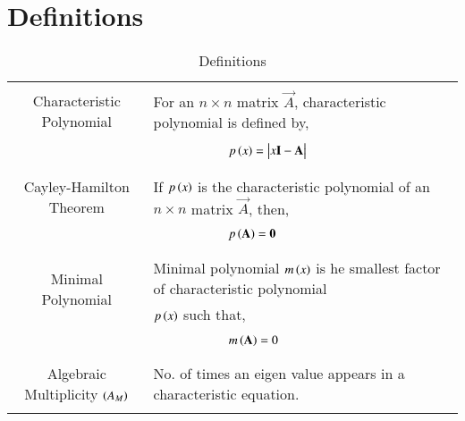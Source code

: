 \documentclass[journal,12pt]{IEEEtran}
\begin{document}
\section{\textbf{Definitions}}
\renewcommand{\thetable}{1}
\begin{table}[ht!]
\centering
\begin{tabular}{|c|l|}
    \hline
	\multirow{3}{*}{Characteristic Polynomial} 
	& \\
	& For an $n\times n$ matrix $\vec{A}$, characteristic polynomial is defined by,\\
	&\\
	& $\qquad\qquad\qquad p\brak{x}=\mydet{x\Vec{I}-\Vec{A}}$\\
	&\\
	\hline
	\multirow{3}{*}{Cayley-Hamilton Theorem}
    &\\
    & If $p\left(x\right)$ is the characteristic polynomial of an $n\times n$ matrix $\vec{A}$, then,\\
    &\\
    &$\qquad \qquad \qquad p\left(\mathbf{A}\right)=\mathbf{0}$\\
    &\\
    \hline
	\multirow{3}{*}{Minimal Polynomial} 
	&\\
	& Minimal polynomial $m\left(x\right)$ is he smallest factor of characteristic polynomial\\
	& $p\left(x\right)$ such that,\\
	&\\
	& $\qquad \qquad \qquad m\left(\mathbf{A}\right)=0$\\
	&\\
    \hline
    \multirow{3}{*}{Algebraic Multiplicity $\left(A_M\right)$}
    &\\
    & No. of times an eigen value appears in a characteristic equation.\\
    &\\
    \hline
\end{tabular}
\label{table:1}
    \caption{Definitions}
\end{table}
\newpage
\end{document}
